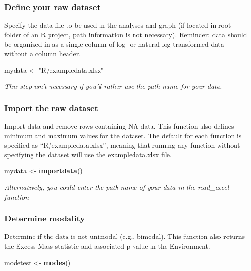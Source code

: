 \documentclass[
]{article}
\newenvironment{Shaded}{\begin{snugshade}}{\end{snugshade}}
\newcommand{\FunctionTok}[1]{\textcolor[rgb]{0.13,0.29,0.53}{\textbf{#1}}}
\newcommand{\NormalTok}[1]{#1}
\newcommand{\OtherTok}[1]{\textcolor[rgb]{0.56,0.35,0.01}{#1}}
\newcommand{\StringTok}[1]{\textcolor[rgb]{0.31,0.60,0.02}{#1}}
\begin{document}
\subsubsection{Define your raw dataset}\label{define-your-raw-dataset}

Specify the data file to be used in the analyses and graph (if located
in root folder of an R project, path information is not necessary).
Reminder: data should be organized in as a single column of log- or
natural log-transformed data without a column header.

\begin{Shaded}
\begin{Highlighting}[]
\NormalTok{mydata }\OtherTok{\textless{}{-}} \StringTok{"R/exampledata.xlsx"}
\end{Highlighting}
\end{Shaded}

\emph{This step isn't necessary if you'd rather use the path name for
your data.}

\subsubsection{Import the raw dataset}\label{import-the-raw-dataset}

Import data and remove rows containing NA data. This function also
defines minimum and maximum values for the dataset. The default for each
function is specified as ``R/exampledata.xlsx'', meaning that running
any function without specifying the dataset will use the
exampledata.xlsx file.

\begin{Shaded}
\begin{Highlighting}[]
\NormalTok{mydata }\OtherTok{\textless{}{-}} \FunctionTok{importdata}\NormalTok{()}
\end{Highlighting}
\end{Shaded}

\emph{Alternatively, you could enter the path name of your data in the
read\_excel function}

\subsubsection{Determine modality}\label{determine-modality}

Determine if the data is not unimodal (e.g., bimodal). This function
also returns the Excess Mass statistic and associated p-value in the
Environment.

\begin{Shaded}
\begin{Highlighting}[]
\NormalTok{modetest }\OtherTok{\textless{}{-}} \FunctionTok{modes}\NormalTok{()}
\end{Highlighting}
\end{Shaded}
\end{document}
